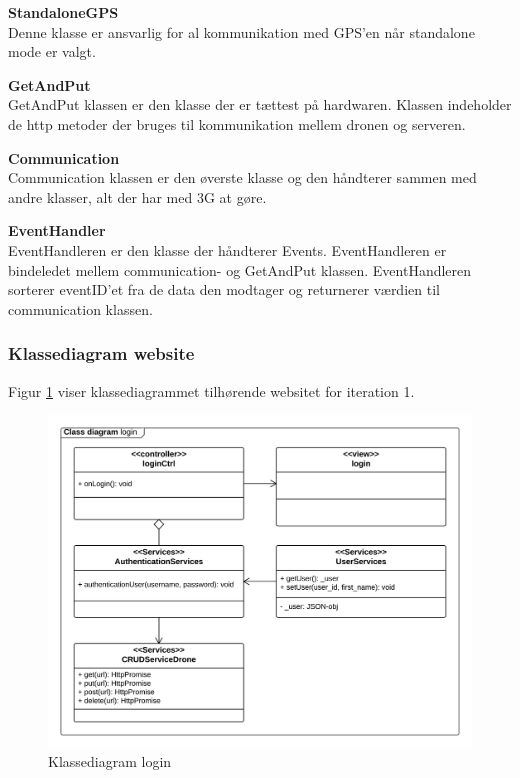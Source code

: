 \textbf{StandaloneGPS}\\
Denne klasse er ansvarlig for al kommunikation med GPS'en når standalone mode er valgt. 

\textbf{GetAndPut} \\
GetAndPut klassen er den klasse der er tættest på hardwaren. Klassen indeholder de http metoder der bruges til kommunikation mellem dronen og serveren. 

\textbf{Communication} \\
Communication klassen er den øverste klasse og den håndterer sammen med andre klasser, alt der har med 3G at gøre.

\textbf{EventHandler} \\
EventHandleren er den klasse der håndterer Events. EventHandleren er bindeledet mellem communication- og GetAndPut klassen. EventHandleren sorterer eventID'et fra de data den modtager og returnerer værdien til communication klassen. 


\newpage

\subsubsection*{Klassediagram website}
\vspace{-0.2cm}
Figur \ref{fig:classDiagram_login} viser klassediagrammet tilhørende websitet for iteration 1.
\vspace{-0.2cm}
\begin{figure}[H]
	\centering
	\includegraphics[width=1\textwidth]{Billeder/klasse_diagrammer/login_class_diagram.png}
	\vspace{-0.5cm}
	\caption{Klassediagram login}
	\label{fig:classDiagram_login}
\end{figure}

